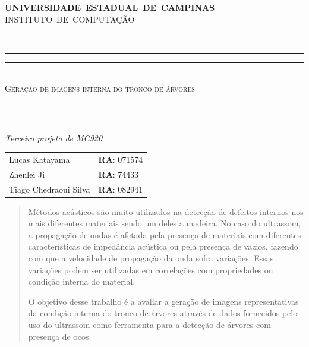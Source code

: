 \documentclass[10pt,a4paper]{article}
\begin{document}
\thispagestyle{empty}

\begin{minipage}[h]{0.10\linewidth}
\end{minipage}
\begin{minipage}[h!]{0.7\linewidth}
  \vspace*{\fill}
  \centering
  {\large \textbf{UNIVERSIDADE~ESTADUAL~DE~CAMPINAS}}\\ 
  {\large INSTITUTO~DE~COMPUTAÇÃO}                   
  \vspace*{\fill} 
\end{minipage}
\\\vspace{0.5cm}

\begin{center} 
  \rule{11.0cm}{0.4pt}\vspace*{-\baselineskip}\vspace{-2.0pt}
  \rule{11.0cm}{1.6pt} \\
  {\large \textsc{Geração de imagens interna do tronco de árvores}}\vspace{-7pt}
  \rule{11.0cm}{0.4pt}\vspace*{-\baselineskip}\vspace{3.2pt} \rule{11.0cm}{1.6pt}\\
  {\textsl{Terceiro projeto de MC920 }}
  \\\vspace{1cm}
  \begin{tabular}{ll}
    Lucas Katayama & \textbf{RA}: 071574\\
    Zhenlei Ji     & \textbf{RA}: 74433\\
    Tiago Chedraoui Silva        & \textbf{RA}: 082941\\
  \end{tabular}
\end{center}
\vspace{0.5cm}
\begin{abstract}

  Métodos acústicos são muito utilizados na detecção de defeitos internos nos mais diferentes
  materiais sendo um deles a madeira. No caso do ultrassom, a propagação
  de ondas é afetada pela presença de materiais com diferentes características de impedância
  acústica ou pela presença de vazios, fazendo com que a velocidade de propagação da onda
  sofra variações. Essas variações podem ser utilizadas em correlações com propriedades ou
  condição interna do material. 

  O objetivo desse trabalho é a avaliar a geração de imagens representativas da condição interna do tronco de árvores através de dados fornecidos pelo uso do ultrassom como ferramenta para a detecção de árvores com presença de ocos.\end{abstract}
\end{document}
